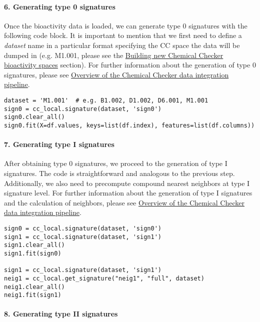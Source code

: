\paragraph{6. Generating type 0 signatures} \leavevmode

Once the bioactivity data is loaded, we can generate type 0 signatures with the following code block. It is important to mention that we first need to define a \textit{dataset} name in a particular format specifying the CC space the data will be dumped in (e.g. M1.001, please see the \hyperref[Building_NEW_CC_BIOACTIVITY_SPACES]{Building new Chemical Checker bioactivity spaces} section). For further information about the generation of type 0 signatures, please see \hyperref[Overview of the Chemical Checker data integration pipeline]{Overview of the Chemical Checker data integration pipeline}. \\

\begin{lstlisting}
dataset = 'M1.001'  # e.g. B1.002, D1.002, D6.001, M1.001
sign0 = cc_local.signature(dataset, 'sign0')
sign0.clear_all()
sign0.fit(X=df.values, keys=list(df.index), features=list(df.columns))
\end{lstlisting}


\paragraph{7. Generating type I signatures} \leavevmode

After obtaining type 0 signatures, we proceed to the generation of type I signatures. The code is straightforward and analogous to the previous step. Additionally, we also need to precompute compound nearest neighbors at type I signature level. For further information about the generation of type I signatures and the calculation of neighbors, please see \hyperref[Overview of the Chemical Checker data integration pipeline]{Overview of the Chemical Checker data integration pipeline}. \\

\begin{lstlisting}
sign0 = cc_local.signature(dataset, 'sign0')
sign1 = cc_local.signature(dataset, 'sign1')
sign1.clear_all()
sign1.fit(sign0)

sign1 = cc_local.signature(dataset, 'sign1')
neig1 = cc_local.get_signature("neig1", "full", dataset)
neig1.clear_all()
neig1.fit(sign1)
\end{lstlisting}

\paragraph{8. Generating type II signatures} \leavevmode

